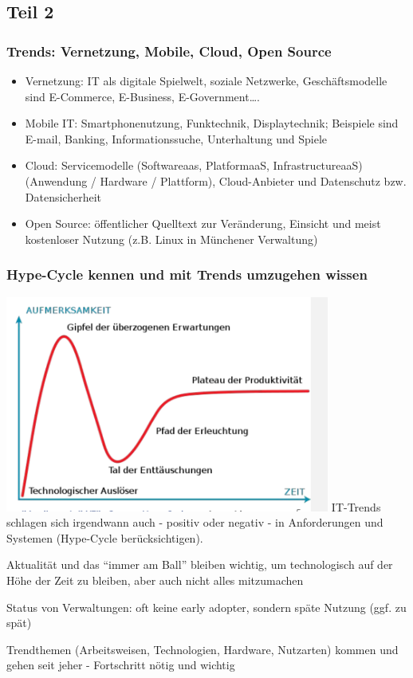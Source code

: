 \subsection{Teil 2}
\subsubsection{Trends: Vernetzung, Mobile, Cloud, Open Source}
\begin{itemize}
  \item Vernetzung: IT als digitale Spielwelt, soziale Netzwerke, Geschäftsmodelle sind E-Commerce, E-Business, E-Government\ldots.
  \item Mobile IT: Smartphonenutzung, Funktechnik, Displaytechnik; Beispiele sind E-mail, Banking, Informationssuche, Unterhaltung und Spiele
  \item Cloud: Servicemodelle (Softwareaas, PlatformaaS, InfrastructureaaS)(Anwendung / Hardware / Plattform), Cloud-Anbieter und Datenschutz bzw. Datensicherheit
  \item Open Source: öffentlicher Quelltext zur Veränderung, Einsicht und meist kostenloser Nutzung (z.B. Linux in Münchener Verwaltung)
\end{itemize}

\subsubsection{Hype-Cycle kennen und mit Trends umzugehen wissen}

\includegraphics[width=0.8\textwidth]{assets/HypeCycle.PNG}
IT-Trends schlagen sich irgendwann auch - positiv oder negativ - in Anforderungen und Systemen (Hype-Cycle berücksichtigen).
\par
Aktualität und das “immer am Ball” bleiben wichtig, um technologisch auf der Höhe der Zeit zu bleiben, aber auch nicht alles mitzumachen
\par Status von Verwaltungen: oft keine early adopter, sondern späte Nutzung (ggf. zu spät)
\par Trendthemen (Arbeitsweisen, Technologien, Hardware, Nutzarten) kommen und gehen seit jeher - Fortschritt nötig und wichtig

